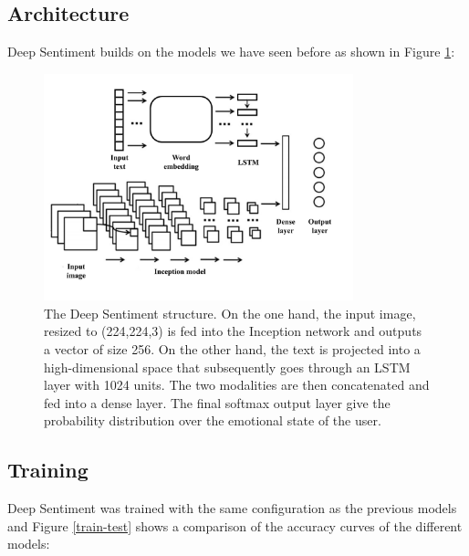 \documentclass{article} %
\begin{document}
\subsection{Architecture}
Deep Sentiment builds on the models we have seen before as shown in Figure \ref{deep-sentiment}:

\begin{figure}[H]
    \centering
    \includegraphics[width=0.8\textwidth]{Images/deep-sentiment-structure.pdf}
    \caption{The Deep Sentiment structure. On the one hand, the input image, resized to (224,224,3) is fed into the Inception network and outputs a vector of size 256. On the other hand, the text is projected into a high-dimensional space that subsequently goes through an LSTM layer with 1024 units. The two modalities are then concatenated and fed into a dense layer. The final softmax output layer give the probability distribution over the emotional state of the user.}
    \label{deep-sentiment}
\end{figure}

\subsection{Training}
Deep Sentiment was trained with the same configuration as the previous models and Figure \ref{train-test} shows a comparison of the accuracy curves of the different models:
\end{document}
